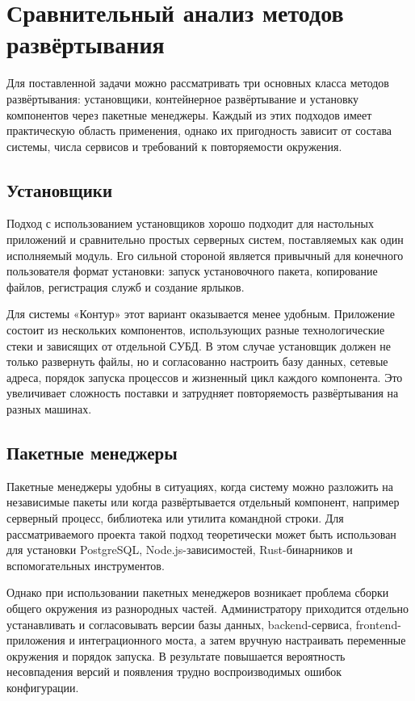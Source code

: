 \section{Сравнительный анализ методов развёртывания}
\headingtextsep

Для поставленной задачи можно рассматривать три основных класса методов развёртывания: установщики, контейнерное развёртывание и установку компонентов через пакетные менеджеры. Каждый из этих подходов имеет практическую область применения, однако их пригодность зависит от состава системы, числа сервисов и требований к повторяемости окружения.

\textheadingsep
\subsection{Установщики}
\headingtextsep

Подход с использованием установщиков хорошо подходит для настольных приложений и сравнительно простых серверных систем, поставляемых как один исполняемый модуль. Его сильной стороной является привычный для конечного пользователя формат установки: запуск установочного пакета, копирование файлов, регистрация служб и создание ярлыков.

Для системы «Контур» этот вариант оказывается менее удобным. Приложение состоит из нескольких компонентов, использующих разные технологические стеки и зависящих от отдельной СУБД. В этом случае установщик должен не только развернуть файлы, но и согласованно настроить базу данных, сетевые адреса, порядок запуска процессов и жизненный цикл каждого компонента. Это увеличивает сложность поставки и затрудняет повторяемость развёртывания на разных машинах.

\textheadingsep
\subsection{Пакетные менеджеры}
\headingtextsep

Пакетные менеджеры удобны в ситуациях, когда систему можно разложить на независимые пакеты или когда развёртывается отдельный компонент, например серверный процесс, библиотека или утилита командной строки. Для рассматриваемого проекта такой подход теоретически может быть использован для установки PostgreSQL, Node.js-зависимостей, Rust-бинарников и вспомогательных инструментов.

Однако при использовании пакетных менеджеров возникает проблема сборки общего окружения из разнородных частей. Администратору приходится отдельно устанавливать и согласовывать версии базы данных, backend-сервиса, frontend-приложения и интеграционного моста, а затем вручную настраивать переменные окружения и порядок запуска. В результате повышается вероятность несовпадения версий и появления трудно воспроизводимых ошибок конфигурации.

